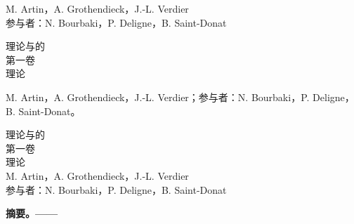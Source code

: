 \begin{center}
M. Artin，A. Grothendieck，J.-L. Verdier\\
参与者：N. Bourbaki，P. Deligne，B. Saint-Donat

\bigskip
{\Large {}理论与的}\\
第一卷\\理论
\end{center}
M. Artin，A. Grothendieck，J.-L. Verdier；参与者：N. Bourbaki，P. Deligne，B. Saint-Donat。
\begin{center}
{\Large {}理论与的}\\第一卷\\理论\\
M. Artin，A. Grothendieck，J.-L. Verdier\\
参与者：N. Bourbaki，P. Deligne，B. Saint-Donat
\end{center}
\textbf{摘要。——}

